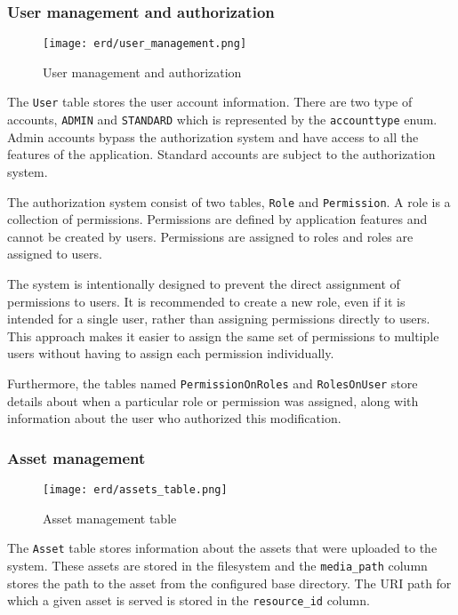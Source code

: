 \documentclass[../main.tex]{subfiles}
\begin{document}
\subsubsection{User management and authorization}

\begin{figure}[H]
  \centering
  \texttt{[image: erd/user\_management.png]}
  \caption{User management and authorization}
\end{figure}

The \texttt{User} table stores the user account information.
There are two type of accounts, \texttt{ADMIN} and \texttt{STANDARD} which is represented by the \texttt{accounttype} enum.
Admin accounts bypass the authorization system and have access to all the features of the application. Standard accounts are subject to the authorization system.

The authorization system consist of two tables, \texttt{Role} and \texttt{Permission}. A role is a collection of permissions.
Permissions are defined by application features and cannot be created by users. Permissions are assigned to roles and roles are assigned to users.

The system is intentionally designed to prevent the direct assignment of permissions to users.
It is recommended to create a new role, even if it is intended for a single user, rather than assigning permissions directly to users.
This approach makes it easier to assign the same set of permissions to multiple users without having to assign each permission individually.

Furthermore, the tables named \texttt{PermissionOnRoles} and \texttt{RolesOnUser} store details about when a particular role or permission was assigned, along with information about the user who authorized this modification.

\subsubsection{Asset management}

\begin{figure}[H]
  \centering
  \texttt{[image: erd/assets\_table.png]}
  \caption{Asset management table}
\end{figure}

The \texttt{Asset} table stores information about the assets that were uploaded to the system.
These assets are stored in the filesystem and the \texttt{media\_path} column stores the path to the asset from the configured base directory.
The URI path for which a given asset is served is stored in the \texttt{resource\_id} column.
\end{document}
